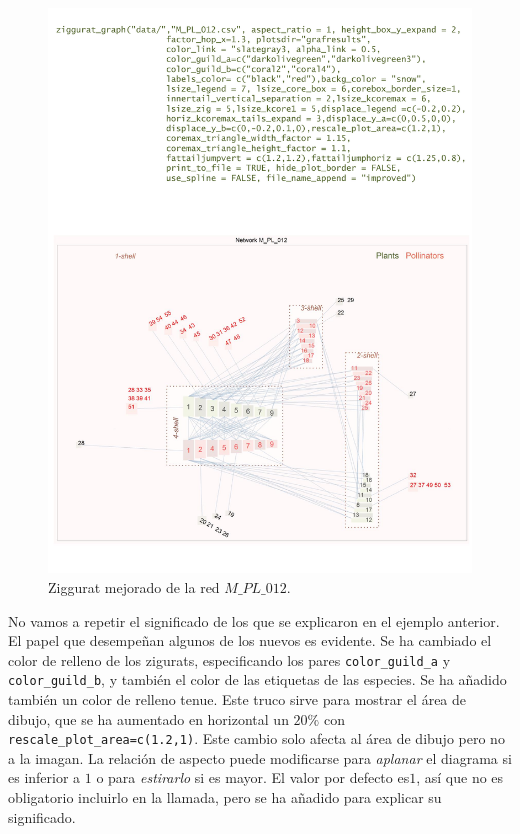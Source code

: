 \clearpage
\begin{figure}[hbt!]
\centering
\includegraphics[scale=0.8]{ManFigs/M_PL_012_ziggurat_improved.pdf}
\caption {Ziggurat mejorado de la red $M\_PL\_012$.}
\label{fig:AKMAN_ziggurat_012_improved}
\end{figure}

\clearpage
No vamos a repetir el significado de los que se explicaron en el ejemplo anterior. El papel que desempeñan algunos de los nuevos
es evidente. Se ha cambiado el color de relleno de los zigurats, especificando los pares \texttt{color\_guild\_a} y \texttt{color\_guild\_b},
y también el color de las etiquetas de las especies. Se ha añadido también un color de relleno tenue. Este truco sirve para mostrar el área de dibujo, que se ha aumentado en horizontal un $20\%$ con \texttt{rescale\_plot\_area=c(1.2,1)}. Este cambio solo afecta al área de dibujo pero no a la imagan. La relación de aspecto puede modificarse para \textit{aplanar} el diagrama si es inferior a $1$ o para \textit{estirarlo} si es mayor. El valor por defecto es$1$, así que no es obligatorio incluirlo en la llamada, pero se ha añadido para explicar su significado.

